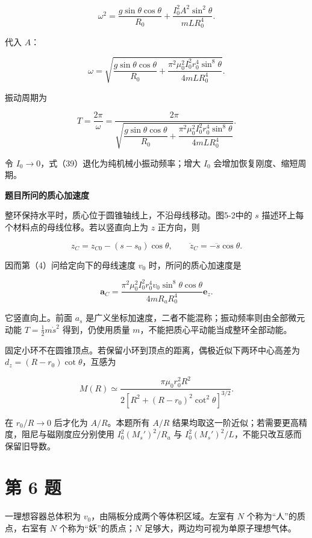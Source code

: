 \documentclass[12pt,a4paper,UTF8]{ctexart}
\begin{document}
\[\omega^2=\frac{g\sin\theta\cos\theta}{R_0}
+\frac{I_0^2A^2\sin^2\theta}{mLR_0^4}.\]

代入 \(A\)：

\[\boxed{
\omega=\sqrt{
\frac{g\sin\theta\cos\theta}{R_0}
+\frac{\pi^2\mu_0^2I_0^2r_0^4\sin^8\theta}
{4mLR_0^4}}
}.\]

振动周期为

\[\boxed{
T=\frac{2\pi}{\omega}
=\frac{2\pi}{\sqrt{
\dfrac{g\sin\theta\cos\theta}{R_0}
+\dfrac{\pi^2\mu_0^2I_0^2r_0^4\sin^8\theta}
{4mLR_0^4}}}
}.\]

令 \(I_0\to0\)，式（39）退化为纯机械小振动频率；增大 \(I_0\)
会增加恢复刚度、缩短周期。

\textbf{题目所问的质心加速度}

整环保持水平时，质心位于圆锥轴线上，不沿母线移动。图5-2中的 \(s\)
描述环上每个材料点的母线位移。若以竖直向上为 \(z\) 正方向，则

\[z_C=z_{C0}-(s-s_0)\cos\theta,\qquad
\ddot z_C=-\ddot s\cos\theta.\]

因而第（4）问给定向下的母线速度 \(v_0\) 时，所问的质心加速度是

\[\boxed{\bm a_C=
\frac{\pi^2\mu_0^2I_0^2r_0^4v_0\sin^8\theta\cos\theta}
{4mR_aR_0^4}\bm e_z.}\]

它竖直向上。前面 \(a_s\)
是广义坐标加速度，二者不能混称；振动频率则由全部微元动能
\(T=\tfrac12m\dot s^2\) 得到，仍使用质量
\(m\)，不能把质心平动能当成整环全部动能。

固定小环不在圆锥顶点。若保留小环到顶点的距离，偶极近似下两环中心高差为
\(d_z=(R-r_0)\cot\theta\)，互感为

\[M(R)\simeq\frac{\pi\mu_0r_0^2R^2}
{2[R^2+(R-r_0)^2\cot^2\theta]^{3/2}}.\]

在 \(r_0/R\to0\) 后才化为 \(A/R\)。本题所有 \(A/R\)
结果均取这一阶近似；若需要更高精度，阻尼与磁刚度应分别使用
\(I_0^2(M_s')^2/R_a\) 与 \(I_0^2(M_s')^2/L\)，不能只改互感而保留旧导数。

\newpage

\section{第 6 题}\label{ux7b2c-6-ux9898}

一理想容器总体积为 \(v_0\)，由隔板分成两个等体积区域。左室有 \(N\)
个称为``人''的质点，右室有 \(N\) 个称为``妖''的质点；\(N\)
足够大，两边均可视为单原子理想气体。
\end{document}
